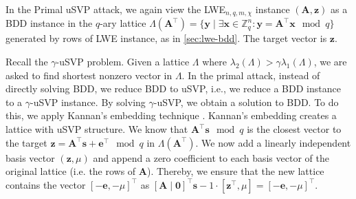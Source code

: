 

In the Primal uSVP attack, we again view the LWE$_{n, q, m, \chi}$ instance $(\mathbf{A}, \mathbf{z})$ as a BDD instance in the  $q$-ary lattice $\Lambda(\mathbf{A}^\intercal) = \{ \mathbf{y} \mid \exists \mathbf{x} \in \mathbb{Z}_q^n : \mathbf{y} = \mathbf{A}^\intercal \mathbf{x}  \mod q \}$ generated by rows of LWE instance, as in \cref{sec:lwe-bdd}. The target vector is $\mathbf{z}$. %

Recall the $\gamma$-uSVP problem. Given a lattice $\Lambda$ where $\lambda_2(\Lambda) > \gamma \lambda_1(\Lambda)$, we are asked to find shortest nonzero vector in $\Lambda$.
In the primal attack, instead of directly solving BDD, we reduce BDD to uSVP, i.e., we reduce a BDD instance to a $\gamma$-uSVP instance. By solving $\gamma$-uSVP, we obtain a solution to BDD.
To do this, we apply Kannan's embedding technique \cite{Kan87}. %
Kannan's embedding creates a lattice with uSVP structure. We know that $\mathbf{A}^\intercal \mathbf{s}\mod q$ is the closest vector to the target $\mathbf{z} =\mathbf{A}^\intercal \mathbf{s} + \mathbf{e}^\intercal \mod q$ in $\Lambda(\mathbf{A}^\intercal)$. We now add a linearly independent basis vector  $(\mathbf{z}, \mu)$ and append a zero coefficient to each basis vector of the original lattice (i.e. the rows of $\mathbf{A}$). Thereby, we ensure that the new lattice contains the vector $[-\mathbf{e}, -\mu]^\intercal$ as $[\mathbf{A} \mid \mathbf{0}]^\intercal \mathbf{s} - 1 \cdot [\mathbf{z}^\intercal, \mu] = [-\mathbf{e}, -\mu]^\intercal$.


